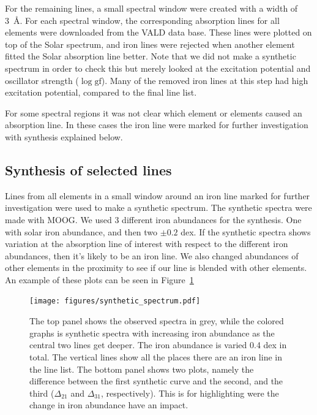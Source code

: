 \documentclass{aa}
\begin{document}
For the remaining lines, a small spectral window were created with a
width of \SI{3}{\angstrom}. For each spectral window, the corresponding
absorption lines for all elements were downloaded from the VALD data
base. These lines were plotted on top of the Solar spectrum, and iron
lines were rejected when another element fitted the Solar absorption
line better. Note that we did not make a synthetic spectrum in order to
check this but merely looked at the excitation potential and oscillator
strength ($\log \mathrm{gf}$). Many of the removed iron lines at this
step had high excitation potential, compared to the final line list.

For some spectral regions it was not clear which element or elements
caused an absorption line. In these cases the iron line were marked for
further investigation with synthesis explained below.



\subsection{Synthesis of selected lines}
\label{sub:synthesis_of_selected_lines}
Lines from all elements in a small window around an iron line marked
for further investigation were used to make a synthetic spectrum.
The synthetic spectra were made with MOOG. We used 3 different iron
abundances for the synthesis. One with solar iron abundance, and
then two $\pm0.2$ dex. If the synthetic spectra shows variation at
the absorption line of interest with respect to the different iron
abundances, then it's likely to be an iron line. We also changed
abundances of other elements in the proximity to see if our line is
blended with other elements. An example of these plots can be seen
in Figure~\ref{fig:synthesis}

\begin{figure}[tpb]
    \centering
    \texttt{[image: figures/synthetic\_spectrum.pdf]}
    \caption{The top panel shows the observed spectra in grey, while
        the colored graphs is synthetic spectra with increasing iron
        abundance as the central two lines get deeper. The iron abundance
        is varied 0.4 dex in total. The vertical lines show all the places
        there are an iron line in the line list. The bottom panel shows
        two plots, namely the difference between the first synthetic curve
        and the second, and the third ($\Delta_{21}$ and $\Delta_{31}$,
        respectively). This is for highlighting were the change in iron
        abundance have an impact.}
    \label{fig:synthesis}
\end{figure}
\end{document}
